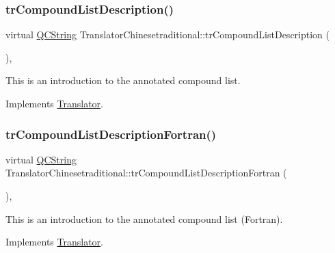 \mbox{\label{class_translator_chinesetraditional_a8a8e007367fd06cca98c81ddf4a430b0}} 
\subsubsection{\texorpdfstring{trCompoundListDescription()}{trCompoundListDescription()}}
{\footnotesize\ttfamily virtual \mbox{\hyperlink{class_q_c_string}{Q\+C\+String}} Translator\+Chinesetraditional\+::tr\+Compound\+List\+Description (\begin{DoxyParamCaption}{ }\end{DoxyParamCaption})\hspace{0.3cm}{\ttfamily [inline]}, {\ttfamily [virtual]}}

This is an introduction to the annotated compound list. 

Implements \mbox{\hyperlink{class_translator}{Translator}}.

\mbox{\label{class_translator_chinesetraditional_a4189f4826592b973a95a57d271eb4f5b}} 
\subsubsection{\texorpdfstring{trCompoundListDescriptionFortran()}{trCompoundListDescriptionFortran()}}
{\footnotesize\ttfamily virtual \mbox{\hyperlink{class_q_c_string}{Q\+C\+String}} Translator\+Chinesetraditional\+::tr\+Compound\+List\+Description\+Fortran (\begin{DoxyParamCaption}{ }\end{DoxyParamCaption})\hspace{0.3cm}{\ttfamily [inline]}, {\ttfamily [virtual]}}

This is an introduction to the annotated compound list (Fortran). 

Implements \mbox{\hyperlink{class_translator}{Translator}}.

